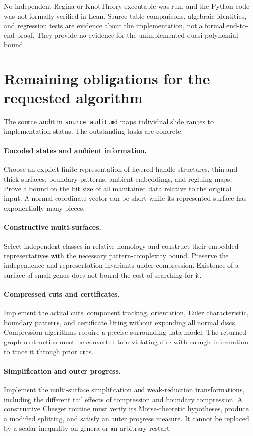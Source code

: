 \documentclass[11pt]{article}
\theoremstyle{definition}
\newcommand{\code}[1]{\texttt{#1}}
\begin{document}
No independent Regina or KnotTheory executable was run, and the Python code
was not formally verified in Lean. Source-table comparisons, algebraic
identities, and regression tests are evidence about the implementation, not a
formal end-to-end proof. They provide no evidence for the unimplemented
quasi-polynomial bound.

\section{Remaining obligations for the requested algorithm}
The source audit in \code{source\_audit.md} maps individual slide ranges to
implementation status. The outstanding tasks are concrete.

\paragraph{Encoded states and ambient information.}
Choose an explicit finite representation of layered handle structures, thin
and thick surfaces, boundary patterns, ambient embeddings, and regluing maps.
Prove a bound on the bit size of all maintained data relative to the original
input. A normal coordinate vector can be short while its represented surface
has exponentially many pieces.

\paragraph{Constructive multi-surfaces.}
Select independent classes in relative homology and construct their embedded
representatives with the necessary pattern-complexity bound. Preserve the
independence and representation invariants under compression. Existence of a
surface of small genus does not bound the cost of searching for it.

\paragraph{Compressed cuts and certificates.}
Implement the actual cuts, component tracking, orientation, Euler
characteristic, boundary patterns, and certificate lifting without expanding
all normal discs. Compression algorithms require a precise surrounding data
model. The returned graph obstruction must be converted to a violating disc
with enough information to trace it through prior cuts.

\paragraph{Simplification and outer progress.}
Implement the multi-surface simplification and weak-reduction transformations,
including the different tail effects of compression and boundary compression.
A constructive Cheeger routine must verify its Morse-theoretic hypotheses,
produce a modified splitting, and satisfy an outer progress measure. It
cannot be replaced by a scalar inequality on genera or an arbitrary restart.
\end{document}
